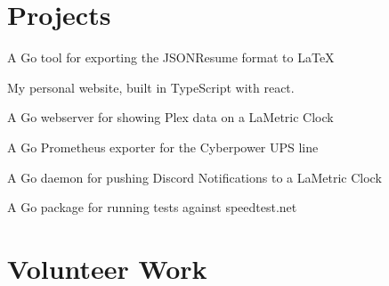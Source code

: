 \documentclass[]{modern}
\begin{document}
\begin{minipage}[t]{0.33\textwidth}
\sectionsep


\section{Projects}
\vspace{\topsep} %
\begin{tightemize}
\item A Go tool for exporting the JSONResume format to LaTeX
\end{tightemize}

\begin{tightemize}
\item My personal website, built in TypeScript with react.
\end{tightemize}

\begin{tightemize}
\item A Go webserver for showing Plex data on a LaMetric Clock
\end{tightemize}

\begin{tightemize}
\item A Go Prometheus exporter for the Cyberpower UPS line
\end{tightemize}

\begin{tightemize}
\item A Go daemon for pushing Discord Notifications to a LaMetric Clock
\end{tightemize}

\begin{tightemize}
\item A Go package for running tests against speedtest.net
\end{tightemize}

\sectionsep


\section{Volunteer Work}


\end{minipage}
\end{document}
